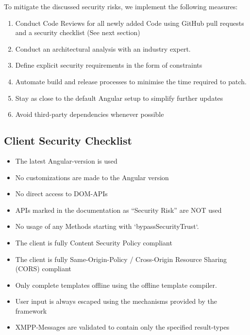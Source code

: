 To mitigate the discussed security risks, we implement the following measures:

\begin{enumerate}
    \item Conduct Code Reviews for all newly added Code using GitHub pull requests and a security checklist (See next section)
    \item Conduct an architectural analysis with an industry expert. %
    \item Define explicit security requirements in the form of constraints
    \item Automate build and release processes to minimise the time required to patch.
    \item Stay as close to the default Angular setup to simplify further updates
    \item Avoid third-party dependencies whenever possible
\end{enumerate}

\subsection{Client Security Checklist}
\begin{itemize}
    \item The latest Angular-version is used
    \item No customizations are made to the Angular version
    \item No direct access to DOM-APIs
    \item APIs marked in the documentation as ``Security Risk'' are NOT used
    \item No usage of any Methods starting with `bypassSecurityTrust`.
    \item The client is fully Content Security Policy compliant
    \item The client is fully Same-Origin-Policy / Cross-Origin Resource Sharing (CORS) compliant
    \item Only complete templates offline using the offline template compiler.
    \item User input is always escaped using the mechanisms provided by the framework
    \item XMPP-Messages are validated to contain only the specified result-types
\end{itemize}